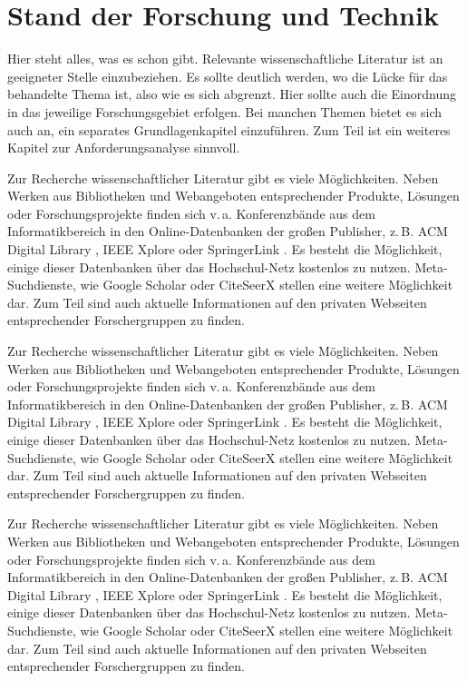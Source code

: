 \section{Stand der Forschung und Technik}\label{chap:sota}

Hier steht alles, was es schon gibt. Relevante wissenschaftliche Literatur ist an geeigneter Stelle einzubeziehen. Es sollte deutlich werden, wo die Lücke für das behandelte Thema ist, also wie es sich abgrenzt. Hier sollte auch die Einordnung in das jeweilige Forschungsgebiet erfolgen. Bei manchen Themen bietet es sich auch an, ein separates Grundlagenkapitel einzuführen. Zum Teil ist ein weiteres Kapitel zur Anforderungsanalyse sinnvoll.

Zur Recherche wissenschaftlicher Literatur gibt es viele Möglichkeiten. Neben Werken aus Bibliotheken und Webangeboten entsprechender Produkte, Lösungen oder Forschungsprojekte finden sich v.\,a. Konferenzbände aus dem Informatikbereich in den Online-Datenbanken der großen Publisher, z.\,B. ACM Digital Library \cite{acmdl}, IEEE Xplore \cite{ieeeexplore} oder SpringerLink \cite{springerlink}. Es besteht die Möglichkeit, einige dieser Datenbanken über das Hochschul-Netz kostenlos zu nutzen. Meta-Suchdienste, wie Google Scholar \cite{googlescholar} oder CiteSeerX \cite{citeseerx} stellen eine weitere Möglichkeit dar. Zum Teil sind auch aktuelle Informationen auf den privaten Webseiten entsprechender Forschergruppen zu finden.

Zur Recherche wissenschaftlicher Literatur gibt es viele Möglichkeiten. Neben Werken aus Bibliotheken und Webangeboten entsprechender Produkte, Lösungen oder Forschungsprojekte finden sich v.\,a. Konferenzbände aus dem Informatikbereich in den Online-Datenbanken der großen Publisher, z.\,B. ACM Digital Library \cite{acmdl}, IEEE Xplore \cite{ieeeexplore} oder SpringerLink \cite{springerlink}. Es besteht die Möglichkeit, einige dieser Datenbanken über das Hochschul-Netz kostenlos zu nutzen. Meta-Suchdienste, wie Google Scholar \cite{googlescholar} oder CiteSeerX \cite{citeseerx} stellen eine weitere Möglichkeit dar. Zum Teil sind auch aktuelle Informationen auf den privaten Webseiten entsprechender Forschergruppen zu finden.

Zur Recherche wissenschaftlicher Literatur gibt es viele Möglichkeiten. Neben Werken aus Bibliotheken und Webangeboten entsprechender Produkte, Lösungen oder Forschungsprojekte finden sich v.\,a. Konferenzbände aus dem Informatikbereich in den Online-Datenbanken der großen Publisher, z.\,B. ACM Digital Library \cite{acmdl}, IEEE Xplore \cite{ieeeexplore} oder SpringerLink \cite{springerlink}. Es besteht die Möglichkeit, einige dieser Datenbanken über das Hochschul-Netz kostenlos zu nutzen. Meta-Suchdienste, wie Google Scholar \cite{googlescholar} oder CiteSeerX \cite{citeseerx} stellen eine weitere Möglichkeit dar. Zum Teil sind auch aktuelle Informationen auf den privaten Webseiten entsprechender Forschergruppen zu finden.


